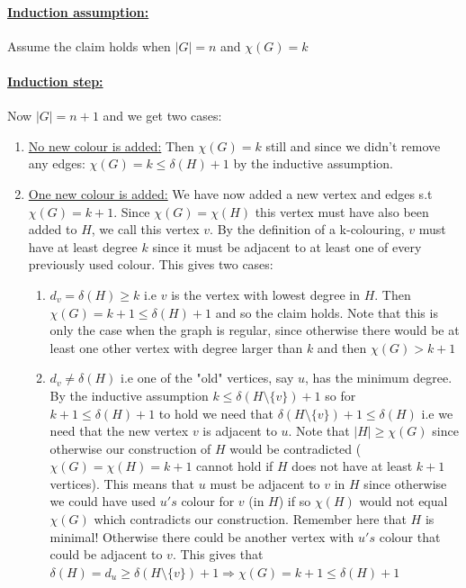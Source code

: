 \documentclass{article}
\begin{document}
\paragraph{\underline{Induction assumption:}} Assume the claim holds when $|G| = n$ and $\chi(G) = k$

\paragraph{\underline{Induction step:}} 
Now $|G| = n+1$ and we get two cases:

\begin{enumerate}
    \item \underline{No new colour is added:} Then $\chi(G) = k$ still and since we didn't remove any edges: $\chi(G) = k \leq \delta(H) + 1$ by the inductive assumption.
    \item \underline{One new colour is added:} We have now added a new vertex and edges s.t $\chi(G) = k+1$.
    Since $\chi(G) = \chi(H)$ this vertex must have also been added to $H$, we call this vertex $v$. By the definition of a k-colouring, $v$ must have at least degree $k$ since it must be adjacent to at least one of every previously used colour. This gives two cases:
    
\begin{enumerate}
    \item $d_{v} = \delta(H) \geq k$ i.e $v$ is the vertex with lowest degree in $H$. Then $\chi(G) = k+1 \leq \delta(H) + 1$ and so the claim holds. Note that this is only the case when the graph is regular, since otherwise there would be at least one other vertex with degree larger than $k$ and then $\chi(G) > k+1$
    
    \item $d_{v} \neq \delta(H)$ i.e one of the "old" vertices, say $u$, has the minimum degree. By the inductive assumption $k \leq \delta(H \setminus \{v\}) + 1$ so for $k+1 \leq \delta(H) +1$ to hold we need that $\delta(H \setminus \{v\}) + 1 \leq \delta(H)$ i.e we need that the new vertex $v$ is adjacent to $u$. Note that $| H | \geq \chi(G)$ since otherwise our construction of $H$ would be contradicted ($\chi(G) = \chi(H) = k+1$ cannot hold if $H$ does not have at least $k+1$ vertices). This means that $u$ must be adjacent to $v$ in $H$ since otherwise we could have used $u's$ colour for $v$ (in $H$) if so $\chi(H) $ would not equal $ \chi(G)$ which contradicts our construction. Remember here that $H$ is minimal! Otherwise there could be another vertex with $u's$ colour that could be adjacent to $v$. This gives that $\delta(H) = d_{u} \geq \delta(H \setminus \{v\}) +1  \Rightarrow  \chi(G) = k+1 \leq \delta(H) +1$
\end{enumerate}
\end{enumerate}
\end{document}
